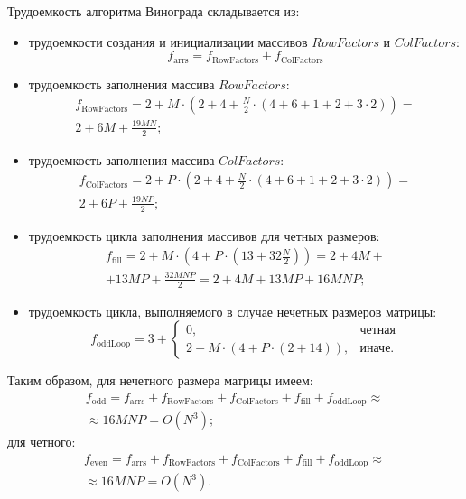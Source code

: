 Трудоемкость алгоритма Винограда складывается из:
\begin{itemize}
    \item трудоемкости создания и инициализации массивов $RowFactors$ и $ColFactors$:
    \begin{equation}
        \label{eqn:f-arrs}
        f_\text{arrs} = f_\text{RowFactors} + f_\text{ColFactors}
    \end{equation}
    \item трудоемкость заполнения массива $RowFactors$:
    \begin{equation}
        \begin{gathered}
            f_\text{RowFactors} = 2 + M \cdot (2 + 4 + \frac{N}{2} \cdot (4 + 6 + 1 + 2 + 3 \cdot 2)) = \\
            2 + 6M + \frac{19MN}{2};
        \end{gathered}
    \end{equation}
    \item трудоемкость заполнения массива $ColFactors$:
    \begin{equation}
        \begin{gathered}
            f_\text{ColFactors} = 2 + P \cdot (2 + 4 + \frac{N}{2} \cdot (4 + 6 + 1 + 2 + 3 \cdot 2)) = \\
            2 + 6P + \frac{19NP}{2};
        \end{gathered}
    \end{equation}
    \item трудоемкость цикла заполнения массивов для четных размеров:
    \begin{equation}
        \begin{gathered}
            f_\text{fill} = 2 + M \cdot (4 + P \cdot (13 + 32\frac{N}{2})) = 2 + 4M + \\
            + 13MP + \frac{32MNP}{2} = 2 + 4M + 13MP + 16MNP;
        \end{gathered}
    \end{equation}
    \item трудоемкость цикла, выполняемого в случае нечетных размеров матрицы:
    \begin{equation}
        f_\text{oddLoop} = 3 + 
        \begin{cases}
            0, & \text{четная} \\
            2 + M \cdot (4 + P \cdot (2 + 14)), & \text{иначе.}
        \end{cases}
    \end{equation}
\end{itemize}
Таким образом, для нечетного размера матрицы имеем:
\begin{multline}
    f_\text{odd} = f_\text{arrs} + f_\text{RowFactors} + f_\text{ColFactors} + f_\text{fill} + f_\text{oddLoop} \approx \\ \approx 16MNP = O(N^3);
\end{multline}
для четного:
\begin{multline}
    f_\text{even} = f_\text{arrs} + f_\text{RowFactors} + f_\text{ColFactors} + f_\text{fill} + f_\text{oddLoop} \approx \\ \approx 16MNP = O(N^3).
\end{multline}

